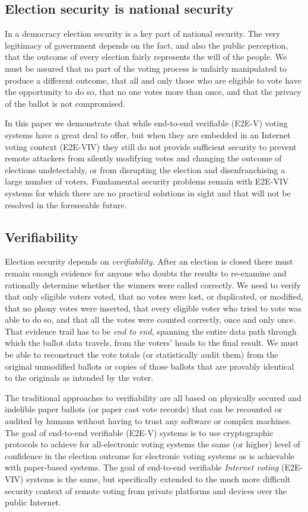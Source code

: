 \subsection{Election security is national security}

In a democracy election security is a key part of national
security. The very legitimacy of government depends on the fact, and
also the public perception, that the outcome of every election fairly
represents the will of the people. We must be assured that no part of
the voting process is unfairly manipulated to produce a different
outcome, that all and only those who are eligible to vote have the
opportunity to do so, that no one votes more than once, and that the
privacy of the ballot is not compromised.

In this paper we demonstrate that while end-to-end verifiable (E2E-V)
voting systems have a great deal to offer, but when they are embedded
in an Internet voting context (E2E-VIV) they still do not provide
sufficient security to prevent remote attackers from silently
modifying votes and changing the outcome of elections undetectably, or
from disrupting the election and disenfranchising a large number of
voters. Fundamental security problems remain with E2E-VIV systems for
which there are no practical solutions in sight and that will not be
resolved in the foreseeable future.

\subsection{Verifiability}

Election security depends on \emph{verifiability}. After an election
is closed there must remain enough evidence for anyone who doubts the
results to re-examine and rationally determine whether the winners
were called correctly. We need to verify that only eligible voters
voted, that no votes were lost, or duplicated, or modified, that no
phony votes were inserted, that every eligible voter who tried to vote
was able to do so, and that all the votes were counted correctly, once
and only once. That evidence trail has to be \emph{end to end},
spanning the entire data path through which the ballot data travels,
from the voters' heads to the final result. We must be able to
reconstruct the vote totals (or statistically audit them) from the
original unmodified ballots or copies of those ballots that are
provably identical to the originals as intended by the voter.

The traditional approaches to verifiability are all based on
physically secured and indelible paper ballots (or paper cast vote
records) that can be recounted or audited by humans without having to
trust any software or complex machines. The goal of end-to-end
verifiable (E2E-V) systems is to use cryptographic protocols to
achieve for all-electronic voting systems the same (or higher) level
of confidence in the election outcome for electronic voting systems as
is achievable with paper-based systems. The goal of end-to-end
verifiable \emph{Internet voting} (E2E-VIV) systems is the same, but
specifically extended to the much more difficult security context of
remote voting from private platforms and devices over the public
Internet.

